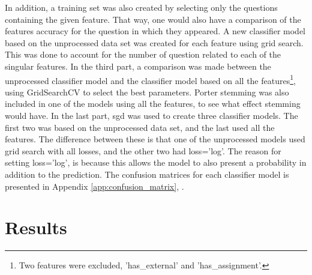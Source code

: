 In addition, a training set was also created by selecting only the questions containing the given feature.
That way, one would also have a comparison of the features accuracy for the question in which they appeared.
A new classifier model based on the unprocessed data set was created for each feature using grid search. 
This was done to account for the number of question related to each of the singular features. 
\clearpage\noindent
In the third part, a comparison was made between the unprocessed classifier model and the classifier model based on all the features\footnote{
	Two features were excluded, 'has\_external' and 'has\_assignment'.
}, using GridSearchCV to select the best parameters.
Porter stemming was also included in one of the models using all the features, to see what effect stemming would have. 
\vspace{0.5em}\newline
In the last part, \gls{sgd} was used to create three classifier models.
The first two was based on the unprocessed data set, and the last used all the features.
The difference between these is that one of the unprocessed models used grid search with all losses, and the other two had loss='log'.
The reason for setting loss='log', is because this allows the model to also present a probability in addition to the prediction.
The confusion matrices for each classifier model is presented in Appendix \ref{app:confusion_matrix}, \pageref{app:confusion_matrix}.



\section{Results}
\label{sec:results}




